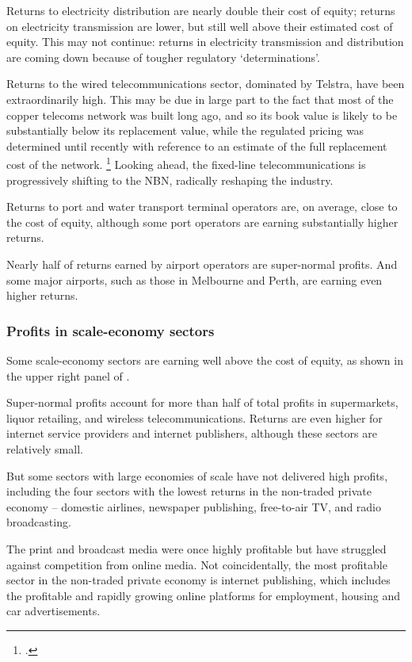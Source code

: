 Returns to electricity distribution are nearly double their cost of equity; returns on electricity transmission are lower, but still well above their estimated cost of equity. This may not continue: returns in electricity transmission and distribution are coming down because of tougher regulatory `determinations'.

Returns to the wired telecommunications sector, dominated by Telstra, have been extraordinarily high. This may be due in large part to the fact that most of the copper telecoms network was built long ago, and so its book value is likely to be substantially below its replacement value, while the regulated pricing was determined until recently with reference to an estimate of the full replacement cost of the network.%
\footcite{ACCC2016TelecommunicationsReports}
Looking ahead, the fixed-line telecommunications is progressively shifting to the NBN, radically reshaping the industry. 

Returns to port and water transport terminal operators are, on average, close to the cost of equity, although some port operators are earning substantially higher returns.

Nearly half of returns earned by airport operators are super-normal profits. And some major airports, such as those in Melbourne and Perth, are earning even higher returns.


\newpage

\subsubsection{Profits in scale-economy sectors}

Some scale-economy sectors are earning well above the cost of equity, as shown in the upper right panel of .

Super-normal profits account for more than half of total profits in supermarkets, liquor retailing, and wireless telecommunications. Returns are even higher for internet service providers and internet publishers, although these sectors are relatively small.

But some sectors with large economies of scale have not delivered high profits, including the four sectors with the lowest returns in the non-traded private economy -- domestic airlines, newspaper publishing, free-to-air TV, and radio broadcasting.

The print and broadcast media were once highly profitable but have struggled against competition from online media. Not coincidentally, the most profitable sector in the non-traded private economy is internet publishing, which includes the profitable and rapidly growing online platforms for employment, housing and car advertisements.

